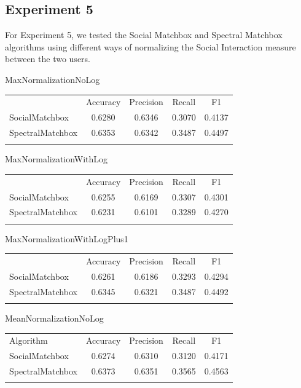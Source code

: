 \subsection{Experiment 5}
\label{sec:2}

For Experiment 5, we tested the Social Matchbox and Spectral Matchbox algorithms using different ways of normalizing the Social Interaction measure between the two users. 

MaxNormalizationNoLog
\begin{table}
\begin{tabular}{ l  c  c  c  c }
\hline\noalign{\smallskip}
 & Accuracy & Precision & Recall & F1 \\
 \noalign{\smallskip}\hline\noalign{\smallskip}
SocialMatchbox & 0.6280 & 0.6346 & 0.3070 & 0.4137 \\
SpectralMatchbox & 0.6353 & 0.6342 & 0.3487 & 0.4497 \\
\noalign{\smallskip}\hline
\end{tabular} 
\end{table}

MaxNormalizationWithLog
\begin{table}
\begin{tabular}{ l  c  c  c  c }
\hline\noalign{\smallskip}
 & Accuracy & Precision & Recall & F1 \\
  \noalign{\smallskip}\hline\noalign{\smallskip}
SocialMatchbox & 0.6255 & 0.6169 & 0.3307 & 0.4301 \\
SpectralMatchbox & 0.6231 & 0.6101 & 0.3289 & 0.4270 \\
\noalign{\smallskip}\hline
\end{tabular} 
\end{table}

MaxNormalizationWithLogPlus1
\begin{table}
\begin{tabular}{ l  c  c  c  c }
\hline\noalign{\smallskip}
 & Accuracy & Precision & Recall & F1 \\
 \noalign{\smallskip}\hline\noalign{\smallskip}
SocialMatchbox & 0.6261 & 0.6186 & 0.3293 & 0.4294 \\
SpectralMatchbox & 0.6345 & 0.6321& 0.3487 & 0.4492 \\
\noalign{\smallskip}\hline
\end{tabular} 
\end{table}

MeanNormalizationNoLog
\begin{table}
\begin{tabular}{ l  c  c  c  c }
\hline\noalign{\smallskip}
Algorithm & Accuracy & Precision & Recall & F1 \\
  \noalign{\smallskip}\hline\noalign{\smallskip}
SocialMatchbox & 0.6274 & 0.6310 & 0.3120 & 0.4171 \\
SpectralMatchbox & 0.6373 & 0.6351 & 0.3565 & 0.4563 \\
\noalign{\smallskip}\hline
\end{tabular} 
\end{table}

